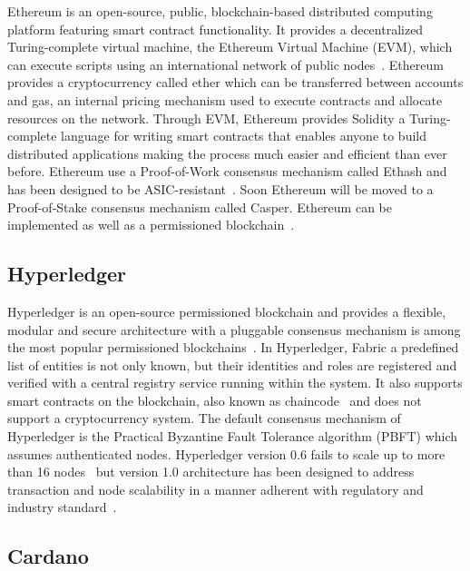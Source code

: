 Ethereum is an open-source, public, blockchain-based distributed computing platform featuring smart contract functionality.
It provides a decentralized Turing-complete virtual machine, the Ethereum Virtual Machine (EVM), which can execute scripts using an
international network of public nodes~\cite{wiki:ethereum}. Ethereum provides a cryptocurrency called ether which can be transferred between accounts and gas,
an internal pricing mechanism used to execute contracts and allocate resources on the network. Through EVM, Ethereum provides Solidity a
Turing-complete language for writing smart contracts that enables anyone to build distributed applications making the process much easier and efficient than ever before.
Ethereum use a Proof-of-Work consensus mechanism called Ethash and has been designed to be ASIC-resistant~\cite{ethash}.
Soon Ethereum will be moved to a Proof-of-Stake consensus mechanism called Casper. Ethereum can be implemented as well as a permissioned blockchain~\cite{consortium_chain_development,quorum}.


\subsection{Hyperledger}\label{blockchain:impl:hyperledger}

Hyperledger is an open-source permissioned blockchain and provides a flexible, modular and secure architecture with a
pluggable consensus mechanism is among the most popular permissioned blockchains~\cite{DBLP:journals/corr/abs-1708-05665}. In Hyperledger, Fabric a predefined list of
entities is not only known, but their identities and roles are registered and verified with a central registry service running within the system.
It also supports smart contracts on the blockchain, also known as chaincode~\cite{bl_consensus} and does not support a cryptocurrency system. The default consensus
mechanism of Hyperledger is the Practical Byzantine Fault Tolerance algorithm (PBFT) which assumes authenticated nodes.
Hyperledger version 0.6 fails to scale up to more than 16 nodes~\cite{DBLP:journals/corr/abs-1708-05665} but version 1.0 architecture has been designed to address transaction and
node scalability in a manner adherent with regulatory and industry standard~\cite{imb_hypeledger_adv}.

\subsection{Cardano}\label{blockchain:impl:cardano}

